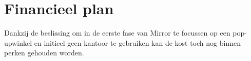 \section{Financieel plan} %
\label{sec:financieel_plan}

Dankzij de beslissing om in de eerste fase van Mirror te focussen op een pop-upwinkel en initieel geen kantoor te gebruiken kan de kost toch nog binnen perken gehouden worden.




